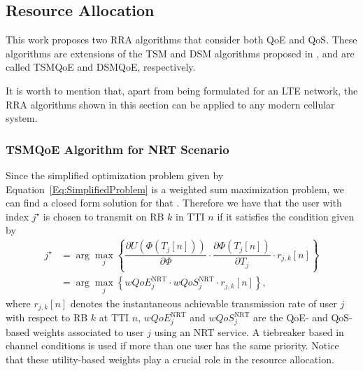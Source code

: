 \documentclass[conference]{IEEEtran}
\newcommand{\SecRef}[1]{Section~\ref{#1}}
\newcommand{\EqRef}[1]{Equation~\ref{#1}}
\newcommand{\AppRef}[1]{Appendix~\ref{#1}}
\begin{document}

\subsection{Resource Allocation}
\label{Sec:resource}
This work proposes two \ac{RRA} algorithms that consider both \ac{QoE} and \ac{QoS}. These algorithms are extensions of the \ac{TSM} and \ac{DSM} algorithms proposed in \cite{Rodrigues2014_Wiley}, and are called TSMQoE and DSMQoE, respectively.

It is worth to mention that, apart from being formulated for an \ac{LTE} network, the \ac{RRA} algorithms shown in this section can be applied to any modern cellular system.

\subsubsection{TSMQoE Algorithm for NRT Scenario}
Since the simplified optimization problem given by \EqRef{Eq:SimplifiedProblem} is a weighted sum maximization problem, we can find a closed form solution for that \cite{Art:Song2005_p2,Proc:Hosein2002}. Therefore we have that the user with index $j^\star$ is chosen to transmit on \ac{RB} $k$ in \ac{TTI} $n$ if it satisfies the condition given by
%
\begin{equation}
\label{Eq:argmaxTSMQoE}
\begin{split}
j^{\star} &= \arg\max_{j} \left\{\dfrac{\partial U\left(\Phi\left(T_j[n]\right)\right)}{\partial \Phi} \cdot \dfrac{\partial \Phi\left(T_j[n]\right)}{\partial {T_j}} \cdot r_{j,k}\left[n\right]\right\} \\&= \arg\max_{j} \left\{wQoE_{j}^{\text{NRT}}\cdot wQoS_{j}^{\text{NRT}} \cdot r_{j,k}\left[n\right]\right\},
\end{split}
\end{equation}
%	
where $r_{j,k}[n]$ denotes the instantaneous achievable transmission rate of user $ j $ with respect to \ac{RB} $k$ at \ac{TTI} $n$, $wQoE_{j}^{\text{NRT}}$ and $wQoS_{j}^{\text{NRT}}$ are the QoE- and QoS-based weights associated to user $j$ using an NRT service. A tiebreaker based in channel conditions is used if more than one user has the same priority. Notice that these utility-based weights play a crucial role in the resource allocation. 
\end{document}
